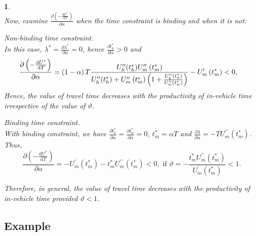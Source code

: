 \documentclass[12pt,a4paper,british]{article}
\makeatletter
\theoremstyle{definition}
\theoremstyle{plain}
\newenvironment{proof}[1][\proofname]{\par
    \normalfont\topsep6\p@\@plus6\p@\relax
    \trivlist
    \itemindent\parindent
    \item[\hskip\labelsep
          \scshape
      #1]\ignorespaces
  }{%
    \endtrivlist\@endpefalse
  }
\providecommand{\proofname}{Proof}
\theoremstyle{plain}
\newtheorem{prop}{\protect\propositionname}
\providecommand{\propositionname}{Proposition}
\makeatother
\begin{document}
\begin{prop}
\begin{proof}
\[\]
Now, examine $\frac{\partial\left(-\frac{\mathrm{d}U^{\ast}}{\mathrm{d}T}\right)}{\partial\alpha}$
when the time constraint is binding and when it is not:
\begin{casenv}
\item Non-binding time constraint. \\
In this case, $\lambda^{\ast}=\frac{\partial\lambda^{\ast}}{\partial\alpha}=0$,
hence $\frac{\partial t_{h}^{\ast}}{\partial\alpha}>0$ and 
\begin{align*}
\frac{\partial\left(-\frac{\mathrm{d}U^{\ast}}{\mathrm{d}T}\right)}{\partial\alpha} & =\left(1-\alpha\right)T\frac{U_{h}^{\prime\prime}\text{\ensuremath{\left(t_{h}^{\ast}\right)}}U_{m}^{\prime\prime}\left(t_{m}^{\ast}\right)}{U_{h}^{\prime\prime}\text{\ensuremath{\left(t_{h}^{\ast}\right)}}+U_{m}^{\prime\prime}\left(t_{m}^{\ast}\right)\left(1+\frac{U_{h}^{\prime\prime}\text{\ensuremath{\left(t_{h}^{\ast}\right)}}}{U_{w}^{\prime\prime}\left(t_{w}^{\ast}\right)}\right)}-U_{m}^{\prime}\left(t_{m}^{\ast}\right)<0,
\end{align*}
Hence, the value of travel time decreases with the productivity of
in-vehicle time irrespective of the value of $\vartheta$.
\item Binding time constraint. \\
With binding constraint, we have $\frac{\partial t_{h}^{\ast}}{\partial\alpha}=\frac{\partial t_{w}^{\ast}}{\partial\alpha}=0$,
$t_{m}^{\ast}=\alpha T$ and $\frac{\partial\lambda}{\partial\alpha}=-TU_{m}^{\prime\prime}\left(t_{m}^{\ast}\right)$.
Thus, 
\[
\frac{\partial\left(-\frac{\mathrm{d}U^{\ast}}{\mathrm{d}T}\right)}{\partial\alpha}=-U_{m}^{\prime}\left(t_{m}^{\ast}\right)-t_{m}^{\ast}U_{m}^{\prime\prime}\left(t_{m}^{\ast}\right)<0,\mbox{ if }\vartheta=-\frac{t_{m}^{\ast}U_{m}^{\prime\prime}\left(t_{m}^{\ast}\right)}{U_{m}^{\prime}\left(t_{m}^{\ast}\right)}<1.
\]
\end{casenv}
Therefore, in general, the value of travel time decreases with the
productivity of in-vehicle time provided $\vartheta<1$.
\end{proof}
\end{prop}

\subsection{Example}
\end{document}
